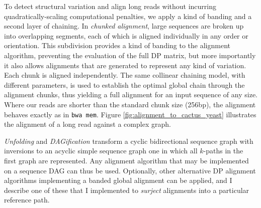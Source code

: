 To detect structural variation and align long reads without incurring quadratically-scaling computational penalties, we apply a kind of banding and a second layer of chaining.
In \emph{chunked alignment}, large sequences are broken up into overlapping segments, each of which is aligned individually in any order or orientation.
This subdivision provides a kind of banding to the alignment algorithm, preventing the evaluation of the full DP matrix, but more importantly it also allows alignments that are generated to represent any kind of variation.
Each chunk is aligned independently.
The same collinear chaining model, with different parameters, is used to establish the optimal global chain through the alignment chunks, thus yielding a full alignment for an input sequence of any size.
Where our reads are shorter than the standard chunk size (256bp), the alignment behaves exactly as in {\tt bwa mem}.
Figure \ref{fig:alignment_to_cactus_yeast} illustrates the alignment of a long read against a complex graph.

\emph{Unfolding} and \emph{DAGification} transform a cyclic bidirectional sequence graph with inversions to an acyclic simple sequence graph one in which all $k$-paths in the first graph are represented.
Any alignment algorithm that may be implemented on a sequence DAG can thus be used.
Optionally, other alternative DP alignment algorithms implementing a banded global alignment can be applied, and I describe one of these that I implemented to \emph{surject} alignments into a particular reference path.

